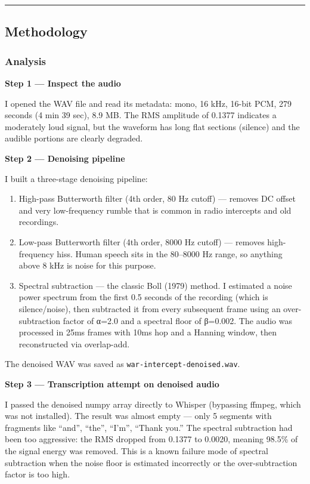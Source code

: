 \documentclass[
]{article}
\begin{document}
\begin{center}\rule{0.5\linewidth}{0.5pt}\end{center}

\subsection{Methodology}\label{methodology}

\subsubsection{Analysis}\label{analysis}

\textbf{Step 1 --- Inspect the audio}

I opened the WAV file and read its metadata: mono, 16 kHz, 16-bit PCM,
279 seconds (4 min 39 sec), 8.9 MB. The RMS amplitude of 0.1377
indicates a moderately loud signal, but the waveform has long flat
sections (silence) and the audible portions are clearly degraded.

\textbf{Step 2 --- Denoising pipeline}

I built a three-stage denoising pipeline:

\begin{enumerate}
\def\labelenumi{\arabic{enumi}.}
\item
  High-pass Butterworth filter (4th order, 80 Hz cutoff) --- removes DC
  offset and very low-frequency rumble that is common in radio
  intercepts and old recordings.
\item
  Low-pass Butterworth filter (4th order, 8000 Hz cutoff) --- removes
  high-frequency hiss. Human speech sits in the 80--8000 Hz range, so
  anything above 8 kHz is noise for this purpose.
\item
  Spectral subtraction --- the classic Boll (1979) method. I estimated a
  noise power spectrum from the first 0.5 seconds of the recording
  (which is silence/noise), then subtracted it from every subsequent
  frame using an over-subtraction factor of α=2.0 and a spectral floor
  of β=0.002. The audio was processed in 25ms frames with 10ms hop and a
  Hanning window, then reconstructed via overlap-add.
\end{enumerate}

The denoised WAV was saved as \texttt{war-intercept-denoised.wav}.

\textbf{Step 3 --- Transcription attempt on denoised audio}

I passed the denoised numpy array directly to Whisper (bypassing ffmpeg,
which was not installed). The result was almost empty --- only 5
segments with fragments like ``and'', ``the'', ``I'm'', ``Thank you.''
The spectral subtraction had been too aggressive: the RMS dropped from
0.1377 to 0.0020, meaning 98.5\% of the signal energy was removed. This
is a known failure mode of spectral subtraction when the noise floor is
estimated incorrectly or the over-subtraction factor is too high.
\end{document}
